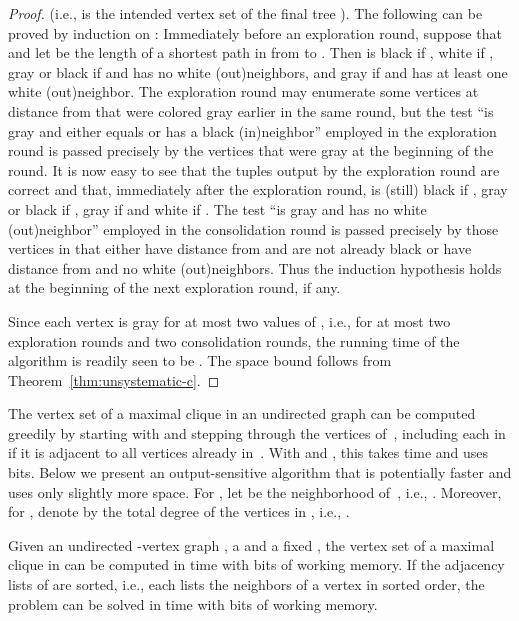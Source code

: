 \documentclass[envcountsame,envcountsect,undated,nolinenumbers]{lnthi}
\begin{document}
\begin{proof}
(i.e.,
 is the intended vertex set of the final tree ).
The following can be proved by induction on :
Immediately before an exploration round,
suppose that 
and let  be the length of a shortest path
in  from  to .
Then  is black if ,
white if ,
gray or black if  and  has no
white (out)neighbors, and
gray if  and  has at least one
white (out)neighbor.
The exploration round may enumerate some vertices
at distance  from  that were colored
gray earlier in the same round, but
the test ``is gray and either equals  or
has a black (in)neighbor''
employed in the exploration round
is passed precisely by the vertices that were
gray at the beginning of the
round.
It is now easy to see that the tuples output
by the exploration round are correct and that,
immediately after the exploration round,
 is (still) black if , gray
or black if , gray
if  and white if .
The test ``is gray and has no white (out)neighbor'' employed
in the consolidation round is
passed precisely by those vertices in 
that either have distance  from  and
are not already black or have distance  from 
and no white (out)neighbors.
Thus the induction hypothesis holds at the
beginning of the next exploration round, if any.

Since each vertex is gray for at most two
values of , i.e., for at most two
exploration rounds and two consolidation rounds,
the running time of the algorithm is readily seen
to be .
The space bound follows from
Theorem~\ref{thm:unsystematic-c}.
\end{proof}

The vertex set  of
a maximal clique in an undirected graph  can be computed
greedily by starting with  and
stepping through the vertices of~, including 
each in  if it is adjacent to all vertices already in~.
With  and , this takes  time
and uses  bits.
Below we present an output-sensitive algorithm that is potentially
faster and uses only slightly more space.
For , let  be the neighborhood of~,
i.e., .
Moreover, for , denote by  the
total degree of the vertices in ,
i.e., .

\begin{theorem}
\label{thm:clique}Given an undirected -vertex graph ,
a  and a fixed ,
the vertex set  of a maximal clique in 
can be computed in  time
with  bits of working memory.
If the adjacency lists of  are sorted, i.e.,
each lists the neighbors of a vertex in sorted order,
the problem can be solved in  time with
 bits of working memory.
\end{theorem}
\end{document}

